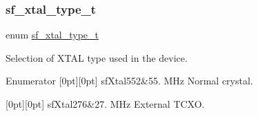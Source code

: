 \subsubsection{\texorpdfstring{sf\_xtal\_type\_t}{sf\_xtal\_type\_t}}
{\footnotesize\ttfamily enum \mbox{\hyperlink{group__sf__enum__group_ga921cd8c6964917cde98f2a132c5548d5}{sf\+\_\+xtal\+\_\+type\+\_\+t}}}



Selection of X\+T\+AL type used in the device. 

\begin{DoxyEnumFields}{Enumerator}
[0pt][0pt]{}\mbox{\label{group__sf__enum__group_gga921cd8c6964917cde98f2a132c5548d5aeec2c76936f143f22966c4e0fc3cf417}} 
sf\+Xtal552&55. M\+Hz Normal crystal. \\
\hline

[0pt][0pt]{}\mbox{\label{group__sf__enum__group_gga921cd8c6964917cde98f2a132c5548d5a5e6adb116a9a9946e482b94bef60f46b}} 
sf\+Xtal276&27. M\+Hz External T\+C\+XO. \\
\hline

\end{DoxyEnumFields}
